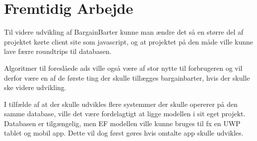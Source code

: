 \chapter{Fremtidig Arbejde}

Til videre udvikling af BargainBarter kunne man ændre det så en større del af projektet kørte client site som javascript, og at projektet på den måde ville kunne lave færre roundtrips til databasen. 

Algoritmer til foreslåede ads ville også være af stor nytte til forbrugeren og vil derfor være en af de første ting der skulle tillægges bargainbarter, hvis der skulle ske videre udvikling.  

I tilfælde af at der skulle udvikles flere systemmer der skulle opererer på den samme database, ville det være fordelagtigt at ligge modellen i sit eget projekt. Databasen er tilgængelig, men EF modellen ville kunne bruges til fx en UWP tablet og mobil app. Dette vil dog først gøres hvis omtalte app skulle udvikles.  